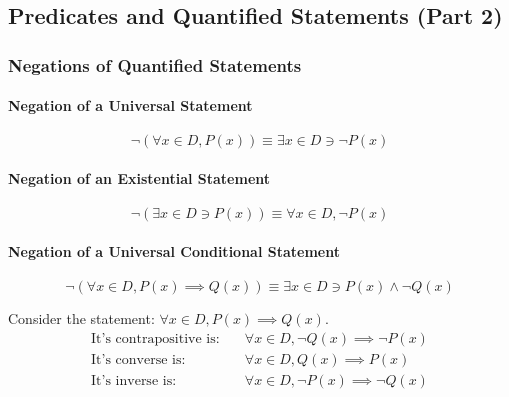 \subsection{Predicates and Quantified Statements (Part 2)}
\hrulefill

\subsubsection*{Negations of Quantified Statements}
\paragraph*{Negation of a Universal Statement}
\begin{equation*}
    \neg(\forall x \in D, P(x)) \equiv \exists x \in D \ni \neg P(x)
\end{equation*}

\paragraph*{Negation of an Existential Statement}
\begin{equation*}
    \neg(\exists x \in D \ni P(x)) \equiv \forall x \in D, \neg P(x)
\end{equation*}

\paragraph*{Negation of a Universal Conditional Statement}
\begin{equation*}
    \neg(\forall x \in D, P(x) \implies Q(x)) \equiv \exists x \in D \ni P(x) \land \neg Q(x)
\end{equation*}

Consider the statement: $\forall x \in D, P(x) \implies Q(x)$.
\begin{align*}
    \text{It's contrapositive is:} \quad &\forall x \in D, \neg Q(x) \implies \neg P(x)\\
    \text{It's converse is:} \quad &\forall x \in D, Q(x) \implies P(x)\\
    \text{It's inverse is:} \quad &\forall x \in D, \neg P(x) \implies \neg Q(x)
\end{align*}